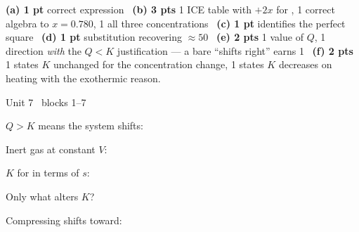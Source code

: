 \documentclass{apchem-worksheet}
\begin{document}
\begin{apcnote}
\textbf{(a) 1 pt} correct expression \textbullet\ \textbf{(b) 3 pts}
1 ICE table with $+2x$ for , 1 correct algebra to $x = 0.780$,
1 all three concentrations \textbullet\ \textbf{(c) 1 pt} identifies the
perfect square \textbullet\ \textbf{(d) 1 pt} substitution recovering
$\approx 50$ \textbullet\ \textbf{(e) 2 pts} 1 value of $Q$, 1 direction
\emph{with} the $Q < K$ justification --- a bare ``shifts right'' earns 1
\textbullet\ \textbf{(f) 2 pts} 1 states $K$ unchanged for the
concentration change, 1 states $K$ decreases on heating with the exothermic
reason.
\end{apcnote}

\begin{spiralstrip}{Unit 7 \textbullet\ blocks 1--7}
  \item $Q > K$ means the system shifts:
  \item Inert gas at constant $V$: 
  \item $K$ for  in terms of $s$: 
  \item Only what alters $K$? 
  \item Compressing shifts toward: 
\end{spiralstrip}
\end{document}
